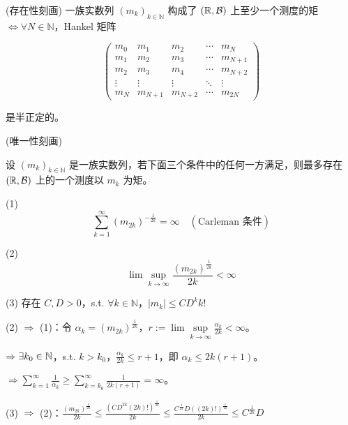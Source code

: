 \begin{theorem}{(存在性刻画)}
    一族实数列 \((m_k)_{k \in \mathbb{N}}\) 构成了 \((\mathbb{R},\mathcal{B})\) 上至少一个测度的矩 \(\Leftrightarrow \forall N \in \mathbb{N}\)，Hankel 矩阵

\begin{equation*}
\begin{pmatrix}
m_0 & m_1 & m_2 & \cdots & m_N \\
m_1 & m_2 & m_3 & \cdots & m_{N+1} \\
m_2 & m_3 & m_4 & \cdots & m_{N+2} \\
\vdots & \vdots & \vdots & \ddots & \vdots \\
m_N & m_{N+1} & m_{N+2} & \cdots & m_{2N}
\end{pmatrix}
\end{equation*}

是半正定的。
\end{theorem}

\begin{theorem}{(唯一性刻画)}

    设 \((m_k)_{k \in \mathbb{N}}\) 是一族实数列，若下面三个条件中的任何一方满足，则最多存在 \((\mathbb{R},\mathcal{B})\) 上的一个测度以 \(m_k\) 为矩。

(1) \begin{equation*}
\sum_{k=1}^{\infty} (m_{2k})^{-\frac{1}{2k}} = \infty \quad (\text{Carleman 条件})
\end{equation*}

(2) \begin{equation*}
\lim\sup_{k \to \infty} \frac{(m_{2k})^{\frac{1}{2k}}}{2k} < \infty
\end{equation*}

(3) 存在 \(C, D > 0\)，s.t. \(\forall k \in \mathbb{N}\)，\(|m_k| \leq C D^k k!\)
\begin{remark}
    (2) \(\Rightarrow\) (1)：令 \(\alpha_k = (m_{2k})^{\frac{1}{2k}}\)，\(r := \lim \sup\limits_{k \to \infty} \frac{\alpha_k}{2k} < \infty\)。

\(\Rightarrow \exists k_0 \in \mathbb{N}\)，s.t. \(k > k_0\)，\(\frac{\alpha_k}{2k} \leq r + 1\)，即 \(\alpha_k \leq 2k(r+1)\)。

\(\Rightarrow \sum\limits_{k=1}^{\infty} \frac{1}{\alpha_k} \geq \sum\limits_{k=k_0}^{\infty} \frac{1}{2k(r+1)} = \infty\)。

(3) \(\Rightarrow\) (2)：\(\frac{(m_{2k})^{\frac{1}{2k}}}{2k} \leq \frac{(C D^{2k} (2k)!)^{\frac{1}{2k}}}{2k} \leq \frac{C^{\frac{1}{2k}} D ((2k)!)^{\frac{1}{2k}}}{2k} \le C^{\frac{1}{2k}} D\)
\end{remark}

\end{theorem}


